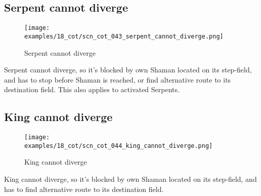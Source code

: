\subsection*{Serpent cannot diverge}
\label{sec:Conquest of Tlalocan/Divergence/Serpent cannot diverge}

\vspace*{-1.4\baselineskip}
\noindent
\begin{figure}[!h]
\texttt{[image: examples/18\_cot/scn\_cot\_043\_serpent\_cannot\_diverge.png]}
\vspace*{-1.3\baselineskip}
\caption{Serpent cannot diverge}
\label{fig:scn_cot_043_serpent_cannot_diverge}
\end{figure}

\vspace*{-0.5\baselineskip}
Serpent cannot diverge, so it's blocked by own Shaman located on its step-field, and
has to stop before Shaman is reached, or find alternative route to its destination
field. This also applies to activated Serpents.


\subsection*{King cannot diverge}
\label{sec:Conquest of Tlalocan/Divergence/King cannot diverge}

\noindent
\begin{wrapfigure}[4]{l}{0.4\textwidth}
\centering
\texttt{[image: examples/18\_cot/scn\_cot\_044\_king\_cannot\_diverge.png]}
\caption{King cannot diverge}
\label{fig:scn_cot_044_king_cannot_diverge}
\end{wrapfigure}
King cannot diverge, so it's blocked by own Shaman located on its step-field,
and has to find alternative route to its destination field.



